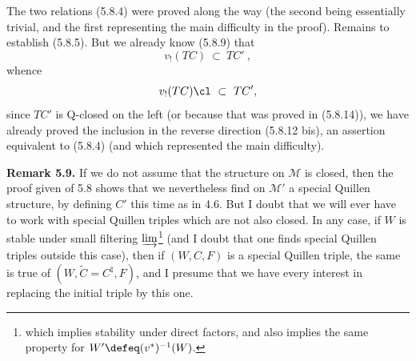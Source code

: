 The two relations (5.8.4) were proved along the way (the second being essentially trivial, and the first representing the main difficulty in the proof). Remains to establish (5.8.5). But we already know (5.8.9) that
\[
v_!(TC) \ \subset \ TC'\ ,
\]
whence
\[
v_!(TC)\cl \ \subset \ TC',
\]
since $TC'$ is Q-closed on the left (or because that was proved in (5.8.14)), we have already proved the inclusion in the reverse direction (5.8.12 bis), an assertion equivalent to (5.8.4) (and which represented the main difficulty).

\textbf{Remark 5.9.} If we do not assume that the structure on $\mathcal{M}$ is closed, then the proof given of 5.8 shows that we nevertheless find on $\mathcal{M}'$ a special Quillen structure, by defining $C'$ this time as in 4.6. But I doubt that we will ever have to work with special Quillen triples which are not also closed. In any case, if $W$ is stable under small filtering $\varinjlim$\footnote[28]{which implies stability under direct factors, and also implies the same property for $W' \defeq (v^*)^{-1}(W)$.} (and I doubt that one finds special Quillen triples outside this case), then if $(W, C, F)$ is a special Quillen triple, the same is true of $(W, \tilde{C} = C^\natural, F)$, and I presume that we have every interest in replacing the initial triple by this one. %
